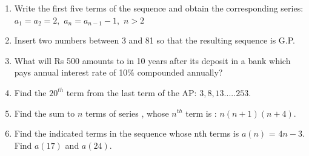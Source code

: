 \begin{enumerate}[label=\thesection.\arabic*,ref=\thesection.\theenumi]
\item Write the first five terms of the sequence and obtain the corresponding series:\\
$a_1=a_2=2,$ $a_n=a_{n-1} -1,$ $n>2$\\
\solution

\pagebreak
\item Insert two numbers between 3 and 81 so that the resulting sequence is G.P.\\

\solution

\pagebreak

\item  What will Rs 500 amounts to in 10 years after its deposit in a bank which pays annual interest rate of 10$\%$ compounded annually?

\solution
    
\pagebreak

\item Find the $20^{th}$ term from the last term of the AP: $3,8,13.....253$.

\solution


\pagebreak
\item Find the sum to $n$ terms of series , whose $n^{th}$ term is : $n(n+1)(n+4)$.

\solution

\pagebreak

\item Find the indicated terms in the sequence whose nth terms is $a(n)$ = $4n-3$. Find $a(17)$ and $a(24)$.
    
\solution 

\pagebreak


\end{enumerate}
